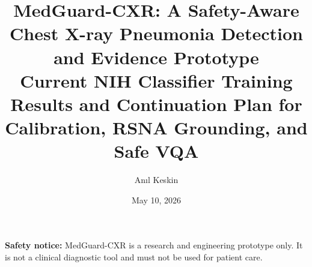 \documentclass[11pt]{article}
\title{MedGuard-CXR: A Safety-Aware Chest X-ray Pneumonia Detection and Evidence Prototype\\
\large Current NIH Classifier Training Results and Continuation Plan for Calibration, RSNA Grounding, and Safe VQA}
\author{Anıl Keskin}
\date{May 10, 2026}
\begin{document}
\maketitle

\begin{center}
\textbf{Safety notice:} MedGuard-CXR is a research and engineering prototype only. It is not a clinical diagnostic tool and must not be used for patient care.
\end{center}













\end{document}
